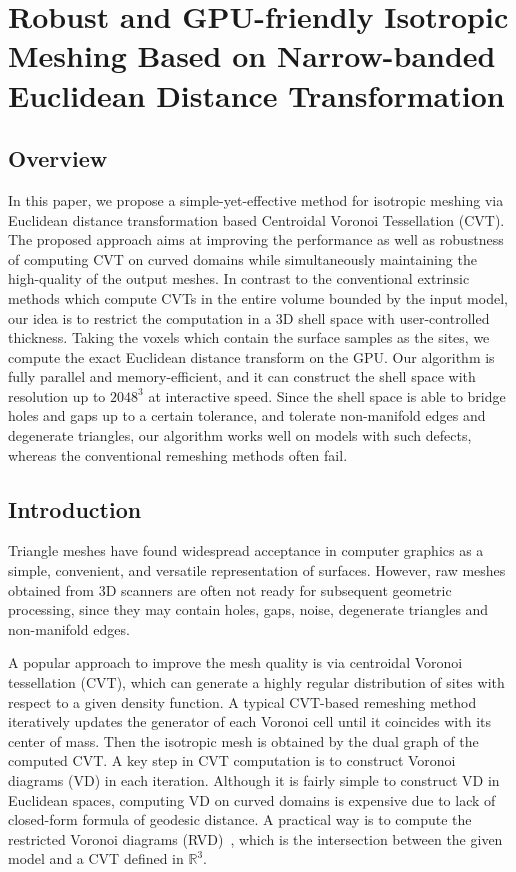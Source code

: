\chapter{Robust and GPU-friendly Isotropic Meshing Based on Narrow-banded Euclidean Distance Transformation}


\section{Overview}
  In this paper, we propose a simple-yet-effective method for isotropic meshing via Euclidean distance transformation based Centroidal Voronoi Tessellation (CVT).
  The proposed approach aims at improving the performance as well as robustness of computing CVT on curved domains
  while simultaneously maintaining the high-quality of the output meshes.
  In contrast to the conventional extrinsic methods which compute CVTs in the entire volume bounded by the input model,
  our idea is to restrict the computation in a 3D shell space with user-controlled thickness.
  Taking the voxels which contain the surface samples as the sites, we compute the exact Euclidean distance transform on the GPU.
  Our algorithm is fully parallel and memory-efficient,
  and it can construct the shell space with resolution up to $2048^3$ at interactive speed.
  Since the shell space is able to bridge holes and gaps up to a certain tolerance, and tolerate non-manifold edges and degenerate triangles,
  our algorithm works well on models with such defects, whereas the conventional remeshing methods often fail.

\section{Introduction}

  Triangle meshes have found widespread acceptance in computer graphics as a simple, convenient, and versatile representation of surfaces.
  However, raw meshes obtained from 3D scanners are often not ready for subsequent geometric processing,
  since they may contain holes, gaps, noise, degenerate triangles and non-manifold edges.

  A popular approach to improve the mesh quality is via centroidal Voronoi tessellation (CVT),
  which can generate a highly regular distribution of sites with respect to a given density function.
  A typical CVT-based remeshing method iteratively updates the generator of each Voronoi cell
  until it coincides with its center of mass.
  Then the isotropic mesh is obtained by the dual graph of the computed CVT.
  A key step in CVT computation is to construct Voronoi diagrams (VD) in each iteration.
  Although it is fairly simple to construct VD in Euclidean spaces,
  computing VD on curved domains is expensive due to lack of closed-form formula of geodesic distance.
  A practical way is to compute the restricted Voronoi diagrams (RVD)~\cite{DBLP:journals/cgf/YanLLSW09},
  which is the intersection between the given model and a CVT defined in $\mathbb{R}^3$.

